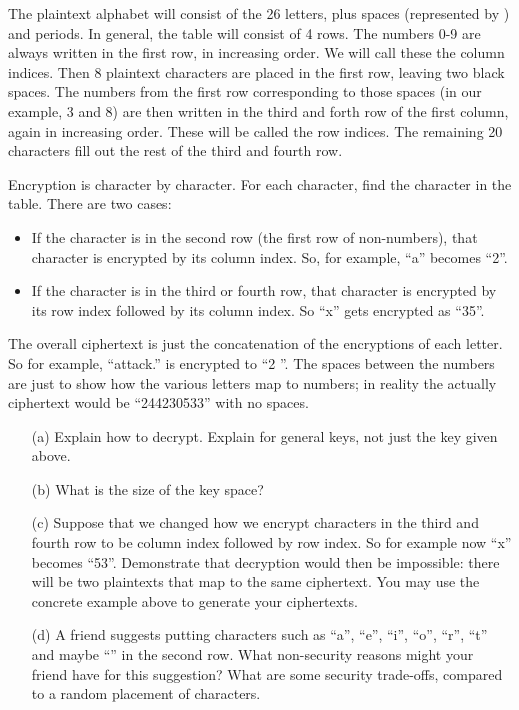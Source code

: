 The plaintext alphabet will consist of the 26 letters, plus spaces (represented by \textunderscore) and periods. In general, the table will consist of 4 rows. The numbers 0-9 are always written in the first row, in increasing order. We will call these the column indices. Then 8 plaintext characters are placed in the first row, leaving two black spaces. The numbers from the first row corresponding to those spaces (in our example, 3 and 8) are then written in the third and forth row of the first column, again in increasing order. These will be called the row indices. The remaining 20 characters fill out the rest of the third and fourth row.

Encryption is character by character. For each character, find the character in the table. There are two cases:
\begin{itemize}
	\item If the character is in the second row (the first row of non-numbers), that character is encrypted by its column index. So, for example, ``a'' becomes ``2''.
	\item If the character is in the third or fourth row, that character is encrypted by its row index followed by its column index. So ``x'' gets encrypted as ``35''.
\end{itemize}
The overall ciphertext is just the concatenation of the encryptions of each letter. So for example, ``attack.'' is encrypted to ``2  ''. The spaces between the numbers are just to show how the various letters map to numbers; in reality the actually ciphertext would be ``244230533'' with no spaces.

\begin{itemize}
	\item[(a)] Explain how to decrypt. Explain for general keys, not just the key given above.
	\item[(b)] What is the size of the key space?
	\item[(c)] Suppose that we changed how we encrypt characters in the third and fourth row to be column index followed by row index. So for example now ``x'' becomes ``53''. Demonstrate that decryption would then be impossible: there will be two plaintexts that map to the same ciphertext. You may use the concrete example above to generate your ciphertexts.
	\item[(d)] A friend suggests putting characters such as ``a'', ``e'', ``i'', ``o'', ``r'', ``t'' and maybe ``\textunderscore'' in the second row. What non-security reasons might your friend have for this suggestion? What are some security trade-offs, compared to a random placement of characters.
\end{itemize}


